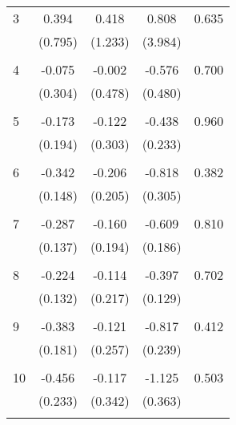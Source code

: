\begin{tabular}{l*{1}{cccc}}
\hline\hline
\hline
   3       & 0.394 & 0.418 & 0.808 & 0.635 \\
          & (0.795) & (1.233) & (3.984) & \\
 & & & &\\
   4       & -0.075 & -0.002 & -0.576 & 0.700 \\
          & (0.304) & (0.478) & (0.480) & \\
 & & & &\\
   5       & -0.173 & -0.122 & -0.438 & 0.960 \\
          & (0.194) & (0.303) & (0.233) & \\
 & & & &\\
   6       & -0.342 & -0.206 & -0.818 & 0.382 \\
          & (0.148) & (0.205) & (0.305) & \\
 & & & &\\
   7       & -0.287 & -0.160 & -0.609 & 0.810 \\
          & (0.137) & (0.194) & (0.186) & \\
 & & & &\\
   8       & -0.224 & -0.114 & -0.397 & 0.702 \\
          & (0.132) & (0.217) & (0.129) & \\
 & & & &\\
   9       & -0.383 & -0.121 & -0.817 & 0.412 \\
          & (0.181) & (0.257) & (0.239) & \\
 & & & &\\
  10       & -0.456 & -0.117 & -1.125 & 0.503 \\
          & (0.233) & (0.342) & (0.363) & \\
 & & & &\\
\hline\hline
\end{tabular}
